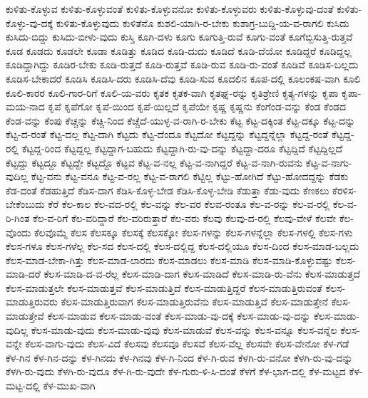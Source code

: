 {ಕುಳಿತು-ಕೊಳ್ಳುವ
ಕುಳಿತು-ಕೊಳ್ಳುವಂತೆ
ಕುಳಿತು-ಕೊಳ್ಳುವನೋ
ಕುಳಿತು-ಕೊಳ್ಳುವರು
ಕುಳಿತು-ಕೊಳ್ಳುವು-ದಂತೆ
ಕುಳಿತು-ಕೊಳ್ಳು-ವು-ದಕ್ಕೆ
ಕುಳಿತು-ಕೊಳ್ಳುವುದು
ಕುಳಿತೆನೊ
ಕುಶಲಿ-ಯಾಗಿ-ರ-ಬೇಕು
ಕುಶಾಗ್ರ-ಬುದ್ದಿ-ಯ-ವ-ರಾಗಲಿ
ಕುಸಿದು
ಕುಸಿದು-ಬಿದ್ದು
ಕುಸಿದು-ಬೀಳು-ವುದು
ಕುಸ್ತಿ
ಕೂಗಿ-ದಳು
ಕೂಗು
ಕೂಗುತ್ತಿ-ರುವೆ
ಕೂಗು-ವಂತೆ
ಕೂಗೆಬ್ಬಿಸುತ್ತಿ-ರುತ್ತವೆ
ಕೂಡ
ಕೂಡದು
ಕೂಡಲೇ
ಕೂಡಾ
ಕೂಡಿತ್ತು
ಕೂಡಿದ
ಕೂಡಿ-ದುದು
ಕೂಡಿದೆ
ಕೂಡಿ-ದೆಯೋ
ಕೂಡಿದ್ದರೆ
ಕೂಡಿದ್ದಲ್ಲ
ಕೂಡಿದ್ದಾಗಿದ್ದು
ಕೂಡಿರ-ಬೇಕು
ಕೂಡಿ-ರುತ್ತದೆ
ಕೂಡಿ-ರುತ್ತವೆ
ಕೂಡಿ-ರುವ
ಕೂಡಿ-ರು-ವಂತೆ
ಕೂಡಿವೆ
ಕೂಡಿಸ-ಬಲ್ಲದು
ಕೂಡಿಸ-ಬೇಕಾದರೆ
ಕೂಡಿಸಿ
ಕೂಡಿಸಿ-ದರು
ಕೂಡಿಸಿ-ದೆವು
ಕೂಡಿ-ಸುವ
ಕೂದಲಿನ
ಕೂಪ-ದಲ್ಲಿ
ಕೂಲಂಕಷ-ವಾಗಿ
ಕೂಲಿ
ಕೂಲಿ-ಕಾರರ
ಕೂಲಿ-ಗಾರ-ರಿಗೆ
ಕೂಲಿ-ಯ-ವರು
ಕೃತಕ
ಕೃತಕ-ವಾಗಿ
ಕೃತಘ್ನ-ರನ್ನು
ಕೃತಿಶ್ರೇಣಿ
ಕೃತ್ಯ-ಗಳನ್ನು
ಕೃಪಾ
ಕೃಪಾ-ಮಯ-ನಾದ
ಕೃಪೆ
ಕೃಪೆಗೋ
ಕೃಪೆ-ಯಿಂದ
ಕೃಪೆ-ಯಿಲ್ಲದೆ
ಕೃಪೆಯೇ
ಕೃಷ್ಣ
ಕೃಷ್ಣನು
ಕೆಂಗೆಂಡ-ವನ್ನು
ಕೆಂಡ
ಕೆಂಡದ
ಕೆಂಡ-ವನ್ನು
ಕೆಂಪು
ಕೆಚ್ಚನ್ನು
ಕೆಚ್ಚಿ-ನಿಂದ
ಕೆಚ್ಚೆದೆ-ಯುಳ್ಳ-ವ-ರಾಗಿ-ರ-ಬೇಕು
ಕೆಟ್ಟ
ಕೆಟ್ಟ-ದಕ್ಕಿಂತ
ಕೆಟ್ಟ-ದಕ್ಕೂ
ಕೆಟ್ಟ-ದನ್ನು
ಕೆಟ್ಟ-ದ-ರಂತೆ
ಕೆಟ್ಟ-ದಲ್ಲ
ಕೆಟ್ಟ-ದಾಗಿ
ಕೆಟ್ಟದು
ಕೆಟ್ಟ-ದೆಂದೂ
ಕೆಟ್ಟದೋ
ಕೆಟ್ಟದ್ದನ್ನು
ಕೆಟ್ಟದ್ದನ್ನೆಲ್ಲಾ
ಕೆಟ್ಟದ್ದ-ರಂತೆ
ಕೆಟ್ಟದ್ದ-ರಲ್ಲಿ
ಕೆಟ್ಟದ್ದ-ರಿಂದ
ಕೆಟ್ಟದ್ದಲ್ಲ
ಕೆಟ್ಟದ್ದಾಗ-ಬಹುದು
ಕೆಟ್ಟದ್ದಾಗಿ-ರು-ವು-ದನ್ನು
ಕೆಟ್ಟದ್ದಾ-ದರೂ
ಕೆಟ್ಟದ್ದಿದೆ
ಕೆಟ್ಟದ್ದಿಲ್ಲದೆ
ಕೆಟ್ಟದ್ದು
ಕೆಟ್ಟದ್ದೂ
ಕೆಟ್ಟದ್ದೇ
ಕೆಟ್ಟದ್ದೊ
ಕೆಟ್ಟವ
ಕೆಟ್ಟ-ವ-ನಲ್ಲ
ಕೆಟ್ಟ-ವ-ನಾಗಿದ್ದರೆ
ಕೆಟ್ಟ-ವ-ನಾಗಿ-ರುವನು
ಕೆಟ್ಟ-ವ-ನಾಗು-ವುದಿಲ್ಲ
ಕೆಟ್ಟ-ವನು
ಕೆಟ್ಟ-ವನೂ
ಕೆಟ್ಟ-ವ-ರಲ್ಲ
ಕೆಟ್ಟ-ವ-ರಾಗಲಿ
ಕೆಟ್ಟಿಲ್ಲ
ಕೆಟ್ಟು-ಹೋಗಿದೆ
ಕೆಟ್ಟು-ಹೋದದ್ದನ್ನು
ಕೆಡಕು
ಕೆಡ-ದಂತೆ
ಕೆಡಹುತ್ತಿದೆ
ಕೆಡಿಸ-ದಾಗ
ಕೆಡಿಸಿ-ಕೊಳ್ಳ-ಬೇಡ
ಕೆಡಿಸಿ-ಕೊಳ್ಳ-ಬೇಡಿ
ಕೆಡುತ್ತಾ
ಕೆಡು-ವುದು
ಕೆಣಕಲು
ಕೆರಳಿಸ-ಬೇಕೆಂಬುದು
ಕೆರೆ
ಕೆಲ-ಕಾಲ
ಕೆಲ-ವದ-ರಲ್ಲಿ
ಕೆಲ-ವನ್ನು
ಕೆಲ-ವರ
ಕೆಲವ-ರಂತೂ
ಕೆಲ-ವ-ರನ್ನು
ಕೆಲ-ವ-ರಲ್ಲಿ
ಕೆಲ-ವ-ರಿ-ಗಿಂತ
ಕೆಲ-ವ-ರಿಗೆ
ಕೆಲ-ವರಿದ್ದಾರೆ
ಕೆಲ-ವರಿರುತ್ತಾರೆ
ಕೆಲ-ವರು
ಕೆಲವು
ಕೆಲವು-ದ-ರಲ್ಲಿ
ಕೆಲವು-ವೇಳೆ
ಕೆಲವೇ
ಕೆಲ-ವೊಂದು
ಕೆಲವೊಮ್ಮೆ
ಕೆಲಸ
ಕೆಲಸಕ್ಕೂ
ಕೆಲಸಕ್ಕೆ
ಕೆಲಸಕ್ಕೋ
ಕೆಲಸ-ಗಳನ್ನು
ಕೆಲಸ-ಗಳನ್ನೆಲ್ಲಾ
ಕೆಲಸ-ಗಳಲ್ಲಿ
ಕೆಲಸ-ಗಳು
ಕೆಲಸ-ಗಳೂ
ಕೆಲಸ-ಗಳೆಲ್ಲ
ಕೆಲ-ಸದ
ಕೆಲಸ-ದಲ್ಲಿ
ಕೆಲಸ-ದಲ್ಲಿದ್ದ
ಕೆಲಸ-ದಲ್ಲಿಯೂ
ಕೆಲಸ-ದಿಂದ
ಕೆಲಸ-ಮಾಡ-ಬಲ್ಲದು
ಕೆಲಸ-ಮಾಡ-ಬೇಕಾ-ಗಿತ್ತು
ಕೆಲಸ-ಮಾಡ-ಲಾರದು
ಕೆಲಸ-ಮಾಡಲು
ಕೆಲಸ-ಮಾಡಿ
ಕೆಲಸ-ಮಾಡಿ-ಕೊಳ್ಳುವಷ್ಟು
ಕೆಲಸ-ಮಾಡಿ-ದರೆ
ಕೆಲಸ-ಮಾಡಿ-ದ-ವ-ರೆಲ್ಲ
ಕೆಲಸ-ಮಾಡಿ-ದಾಗ
ಕೆಲಸ-ಮಾಡಿದೆ
ಕೆಲಸ-ಮಾಡಿ-ರು-ವೆನು
ಕೆಲಸ-ಮಾಡುತ್ತದೆ
ಕೆಲಸ-ಮಾಡುತ್ತಲೇ
ಕೆಲಸ-ಮಾಡುತ್ತವೆ
ಕೆಲಸ-ಮಾಡುತ್ತಿದೆ
ಕೆಲಸ-ಮಾಡುತ್ತಿದ್ದರೆ
ಕೆಲಸ-ಮಾಡುತ್ತಿರುವಂತೆ
ಕೆಲಸ-ಮಾಡುತ್ತಿರುವರು
ಕೆಲಸ-ಮಾಡುತ್ತಿರುವಾಗ
ಕೆಲಸ-ಮಾಡುತ್ತಿರುವೆನು
ಕೆಲಸ-ಮಾಡುತ್ತಿವೆ
ಕೆಲಸ-ಮಾಡುತ್ತೇನೆ
ಕೆಲಸ-ಮಾಡುತ್ತೇವೆ
ಕೆಲಸ-ಮಾಡುವ
ಕೆಲಸ-ಮಾಡು-ವಂತೆ
ಕೆಲಸ-ಮಾಡು-ವು-ದಕ್ಕೆ
ಕೆಲಸ-ಮಾಡು-ವು-ದನ್ನು
ಕೆಲಸ-ಮಾಡು-ವುದಿಲ್ಲ
ಕೆಲಸ-ಮಾಡು-ವುದು
ಕೆಲಸ-ಮಾಡು-ವುವು
ಕೆಲಸ-ಮಾಡುವೆ
ಕೆಲಸ-ವನ್ನು
ಕೆಲಸ-ವನ್ನೂ
ಕೆಲಸ-ವನ್ನೆಲ
ಕೆಲಸ-ವನ್ನೇ
ಕೆಲಸ-ವಾಗು-ವುದು
ಕೆಲಸ-ವಿದೆ
ಕೆಲಸವು
ಕೆಲಸವೂ
ಕೆಲಸವೆ
ಕೆಲಸ-ವೆಲ್ಲ
ಕೆಲಸವೇ
ಕೆಲಸ-ವೇನೋ
ಕೆಳ-ಗಡೆ
ಕೆಳ-ಗಿನ
ಕೆಳ-ಗಿನ-ದನ್ನು
ಕೆಳ-ಗಿನದು
ಕೆಳ-ಗಿನವು
ಕೆಳ-ಗಿ-ನಿಂದ
ಕೆಳ-ಗಿ-ರುವ
ಕೆಳಗಿ-ರು-ವನೋ
ಕೆಳಗಿ-ರು-ವು-ದನ್ನು
ಕೆಳಗಿ-ರು-ವುದು
ಕೆಳಗಿ-ರು-ವುದೂ
ಕೆಳ-ಗಿ-ರು-ವುದೇ
ಕೆಳ-ಗುರು-ಳಿ-ಸಿ-ದಂತೆ
ಕೆಳಗೆ
ಕೆಳ-ಭಾಗ-ದಲ್ಲಿ
ಕೆಳ-ಮಟ್ಟದ
ಕೆಳ-ಮಟ್ಟ-ದಲ್ಲಿ
ಕೆಳ-ಮುಖ-ವಾಗಿ
}
